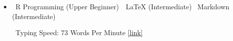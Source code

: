 
\begin{itemize}
    \item[] \textbullet\, R Programming (Upper Beginner)\, \textbullet \, LaTeX (Intermediate) \textbullet \, Markdown (Intermediate) \par\textbullet \ Typing Speed: 73 Words Per Minute \href{https://data.typeracer.com/misc/badge?user=tarek_racer}{[link]}
\end{itemize}

